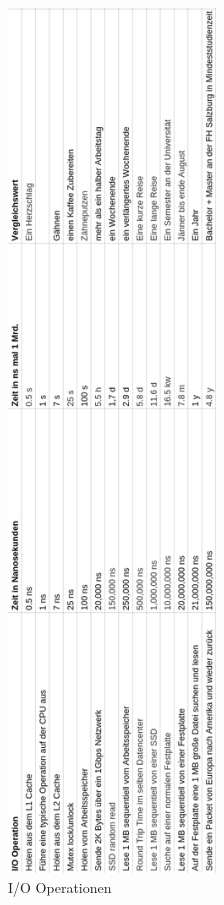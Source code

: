 \begin{figure}[!htb]
  \centering
  \includegraphics[width=5.5cm]{images/io_operations.png}
  \caption{
    I/O Operationen
  }
  \label{figure:syncron_vs_async}
\end{figure}